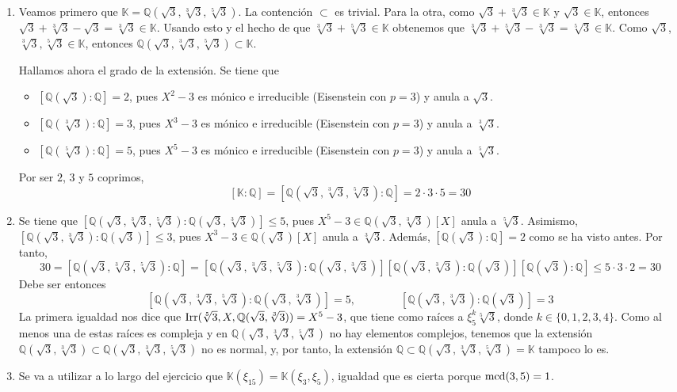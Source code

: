 \documentclass[11pt]{report}
\makeatletter
\renewenvironment{proof}[1][\proofname]{\par
  \pushQED{\qed}%
  \normalfont \topsep\z@skip %
  \trivlist
  \item[\hskip\labelsep
        \itshape
    #1\@addpunct{.}]\ignorespaces
}{%
  \popQED\endtrivlist\@endpefalse
}
\newcommand{\Q}{\mathbb Q}
\newcommand{\K}{\mathbb K}
\makeatother
\begin{document}
\begin{proof}
\hfill
\begin{enumerate}
    \item Veamos primero que $\K = \Q(\sqrt{3},\sqrt[3]{3},\sqrt[5]{3})$. La contención $\subset$ es trivial. Para la otra, como $\sqrt{3}+\sqrt[3]{3} \in \K$ y $\sqrt{3} \in \K$, entonces $\sqrt{3}+\sqrt[3]{3}-\sqrt{3} = \sqrt[3]{3} \in \K$. Usando esto y el hecho de que $\sqrt[3]{3}+\sqrt[5]{3} \in \K$ obtenemos que $\sqrt[3]{3}+\sqrt[5]{3}-\sqrt[3]{3} = \sqrt[5]{3} \in \K$. Como $\sqrt{3}$, $\sqrt[3]{3}, \sqrt[5]{3} \in \K$, entonces $\Q(\sqrt{3},\sqrt[3]{3},\sqrt[5]{3}) \subset \K$.
    
    Hallamos ahora el grado de la extensión. Se tiene que
    \begin{itemize}
        \item $[\Q(\sqrt{3}) \colon \Q] = 2$, pues $X^2-3$ es mónico e irreducible (Eisenstein con $p=3$) y anula a $\sqrt{3}$.
        \item $[\Q(\sqrt[3]{3}) \colon \Q] = 3$, pues $X^3-3$ es mónico e irreducible (Eisenstein con $p=3$) y anula a $\sqrt[3]{3}$.
        \item $[\Q(\sqrt[5]{3}) \colon \Q] = 5$, pues $X^5-3$ es mónico e irreducible (Eisenstein con $p=3$) y anula a $\sqrt[5]{3}$.
    \end{itemize}
    Por ser $2$, $3$ y $5$ coprimos, \[[\K \colon \Q] =[\Q(\sqrt{3}, \sqrt[3]{3}, \sqrt[5]{3}) \colon \Q]= 2\cdot 3 \cdot 5 = 30\]
    \item Se tiene que $[\Q(\sqrt{3}, \sqrt[3]{3}, \sqrt[5]{3}) \colon \Q(\sqrt{3}, \sqrt[3]{3})] \leq 5$, pues $X^5-3 \in \Q(\sqrt{3}, \sqrt[3]{3})[X]$ anula a $\sqrt[5]{3}$. Asimismo, $[\Q(\sqrt{3}, \sqrt[3]{3}) \colon \Q(\sqrt{3})] \leq 3$, pues $X^3-3 \in \Q(\sqrt{3})[X]$ anula a $\sqrt[3]{3}$. Además, $[\Q(\sqrt{3}) \colon \Q] = 2$ como se ha visto antes. Por tanto,
    \[30 = [\Q(\sqrt{3}, \sqrt[3]{3}, \sqrt[5]{3}) \colon \Q] = [\Q(\sqrt{3}, \sqrt[3]{3}, \sqrt[5]{3}) \colon \Q(\sqrt{3}, \sqrt[3]{3})][\Q(\sqrt{3}, \sqrt[3]{3}) \colon \Q(\sqrt{3})][\Q(\sqrt{3}) \colon \Q] \leq 5 \cdot 3 \cdot 2 = 30\]
    Debe ser entonces \[[\Q(\sqrt{3}, \sqrt[3]{3}, \sqrt[5]{3}) \colon \Q(\sqrt{3}, \sqrt[3]{3})] = 5, \qquad \qquad[\Q(\sqrt{3}, \sqrt[3]{3}) \colon \Q(\sqrt{3})] = 3\] La primera igualdad nos dice que $\textup{Irr}(\sqrt[5]{3}, X,\Q(\sqrt{3}, \sqrt[3]{3})) = X^5-3$, que tiene como raíces a $\xi_5^k\sqrt[5]{3}$, donde $k \in \{0,1,2,3,4\}$. Como al menos una de estas raíces es compleja y en $\Q(\sqrt{3}, \sqrt[3]{3}, \sqrt[5]{3})$ no hay elementos complejos, tenemos que la extensión $\Q(\sqrt{3}, \sqrt[3]{3})\subset \Q(\sqrt{3}, \sqrt[3]{3}, \sqrt[5]{3})$ no es normal, y, por tanto, la extensión $\Q \subset \Q(\sqrt{3}, \sqrt[3]{3}, \sqrt[5]{3}) = \K$ tampoco lo es.
    \item Se va a utilizar a lo largo del ejercicio que $\K(\xi_{15}) = \K(\xi_{3},\xi_5)$, igualdad que es cierta porque $\textup{mcd}(3,5)=1$.
    

\end{enumerate}
\end{proof}
\end{document}
